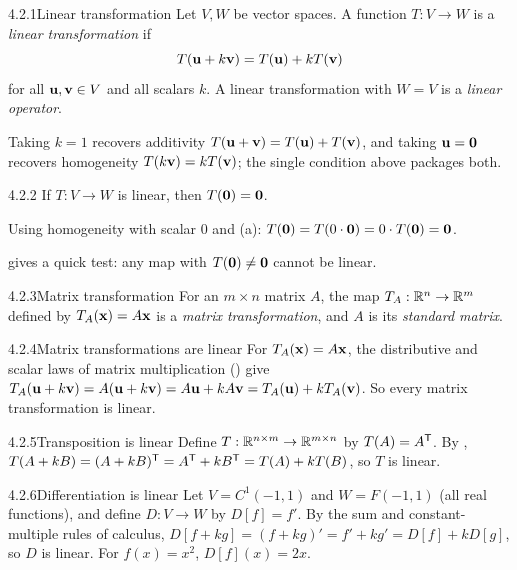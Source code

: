 \begin{defns}{4.2.1}{Linear transformation}
Let $V,W$ be vector spaces. A function $T:V\to W$ is a \emph{linear transformation} if
\[
T(\mathbf{u}+k\mathbf{v})=T(\mathbf{u})+kT(\mathbf{v})
\]
for all $\mathbf{u},\mathbf{v}\in V$ and all scalars $k$. A linear transformation with $W=V$ is a \emph{linear operator}.
\end{defns}

Taking $k=1$ recovers additivity $T(\mathbf{u}+\mathbf{v})=T(\mathbf{u})+T(\mathbf{v})$, and taking $\mathbf{u}=\mathbf{0}$ recovers homogeneity $T(k\mathbf{v})=kT(\mathbf{v})$; the single condition above packages both.

\begin{lems}{4.2.2}{}
If $T:V\to W$ is linear, then $T(\mathbf{0})=\mathbf{0}$.
\end{lems}

\begin{prf}
Using homogeneity with scalar $0$ and (a): $T(\mathbf{0})=T(0\cdot\mathbf{0})=0\cdot T(\mathbf{0})=\mathbf{0}$.
\end{prf}

 gives a quick test: any map with $T(\mathbf{0})\neq\mathbf{0}$ cannot be linear.

\begin{defns}{4.2.3}{Matrix transformation}
For an $m\times n$ matrix $A$, the map $T_A:\mathbb{R}^n\to\mathbb{R}^m$ defined by $T_A(\mathbf{x})=A\mathbf{x}$ is a \emph{matrix transformation}, and $A$ is its \emph{standard matrix}.
\end{defns}

\begin{exmp}{4.2.4}{Matrix transformations are linear}
For $T_A(\mathbf{x})=A\mathbf{x}$, the distributive and scalar laws of matrix multiplication () give $T_A(\mathbf{u}+k\mathbf{v})=A(\mathbf{u}+k\mathbf{v})=A\mathbf{u}+kA\mathbf{v}=T_A(\mathbf{u})+kT_A(\mathbf{v})$. So every matrix transformation is linear.
\end{exmp}

\begin{exmp}{4.2.5}{Transposition is linear}
Define $T:\mathbb{R}^{n\times m}\to\mathbb{R}^{m\times n}$ by $T(A)=A^{\mathsf{T}}$. By , $T(A+kB)=(A+kB)^{\mathsf{T}}=A^{\mathsf{T}}+kB^{\mathsf{T}}=T(A)+kT(B)$, so $T$ is linear.
\end{exmp}

\begin{exmp}{4.2.6}{Differentiation is linear}
Let $V=C^1(-1,1)$ and $W=F(-1,1)$ (all real functions), and define $D:V\to W$ by $D[f]=f'$. By the sum and constant-multiple rules of calculus, $D[f+kg]=(f+kg)'=f'+kg'=D[f]+kD[g]$, so $D$ is linear. For $f(x)=x^2$, $D[f](x)=2x$.
\end{exmp}

